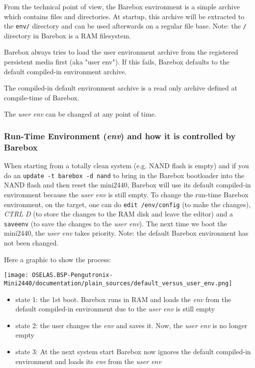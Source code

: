 From the technical point of view, the Barebox environment is a simple
archive which contains files and directories. At startup, this archive will
be extracted to the \texttt{env/} directory and can be used afterwards
on a regular file base. Note: the \texttt{/} directory in Barebox is a RAM
filesystem.

Barebox always tries to load the user environment archive from the registered
persistent media first (aka "user env"). If this fails, Barebox defaults to the
default compiled-in environment archive.

The compiled-in default environment archive is a read only archive defined at
compile-time of Barebox.

The \textit{user env} can be changed at any point of time.

\subsubsection{Run-Time Environment (\textit{env}) and how it is controlled by Barebox}

When starting from a totally clean system (e.g. NAND flash is empty) and if
you do an \texttt{update -t barebox -d nand} to bring in the Barebox bootloader
into the NAND flash and then reset the mini2440, Barebox will use its default
compiled-in environment because the \textit{user env} is still empty. To change
the run-time Barebox environment, on the target, one can do \texttt{edit /env/config}
(to make the changes), \textit{CTRL D} (to store the changes to the RAM disk and
leave the editor) and a \texttt{saveenv} (to save the changes to the
\textit{user env}). The next time we boot the mini2440, the \textit{user env}
takes priority. Note: the default Barebox environment has not been changed.

Here a graphic to show the process:

\centerline{\texttt{[image: OSELAS.BSP-Pengutronix-Mini2440/documentation/plain\_sources/default\_versus\_user\_env.png]}}

\begin{itemize}
	\item state 1: the 1st boot. Barebox runs in RAM and loads the
	      \textit{env} from the default compiled-in environment due to the
	      \textit{user env} is still empty
	\item state 2: the user changes the \textit{env} and saves it. Now, the
	      \textit{user env} is no longer empty
	\item state 3: At the next system start Barebox now ignores the default
	      compiled-in environment and loads its \textit{env} from the
	      \textit{user env}
\end{itemize}

